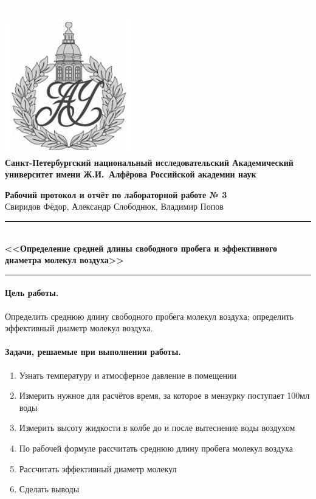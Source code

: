 \documentclass{article}
\begin{document}
\begin{center}
	\includegraphics[scale=0.25]{AU}\\
	{\Large\bfseries Санкт-Петербургский национальный исследовательский Академический университет имени Ж.И.~Алфёрова Российской академии наук}
\end{center}

\begin{center}
	{\large\textbf{Рабочий протокол и отчёт по лабораторной работе № 3}}\\
	Свиридов Фёдор, Александр Слободнюк, Владимир Попов
\end{center}

\begin{center}
\rule{12cm}{0.4mm}\\
\large\bfseries{<<Определение  средней длины свободного пробега и эффективного диаметра молекул воздуха>>}\\
\rule{12cm}{0.4mm}
\end{center}

\paragraph{Цель работы.}
Определить среднюю длину свободного пробега молекул воздуха; определить эффективный диаметр молекул воздуха.

\paragraph{Задачи, решаемые при выполнении работы.}
\begin{enumerate}
	\item Узнать температуру и атмосферное давление в помещении 
	\item Измерить нужное для расчётов время, за которое в мензурку поступает 100мл воды
	\item Измерить высоту жидкости в колбе до и после вытеснение воды воздухом
	\item  По рабочей формуле рассчитать среднюю длину пробега молекул воздуха
	\item  Рассчитать эффективный диаметр молекул
	\item Сделать выводы
\end{enumerate}
\end{document}

